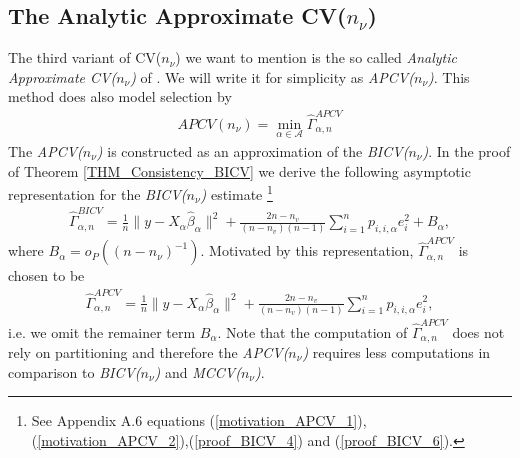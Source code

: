 \documentclass[Research_Module_ES.tex]{subfiles}
\begin{document}
\subsection{The Analytic Approximate CV($n_\nu$)}
The third variant of CV($n_\nu$) we want to mention is the so called \textit{Analytic Approximate CV($n_\nu$)} of \cite{shao}. We will write it for simplicity as \textit{APCV($n_\nu$)}. This method does also model selection by 
\begin{align*}
APCV(n_\nu)=\min_{\alpha\in\mathcal{A}}\hat{\Gamma}_{\alpha,n}^{APCV}
\end{align*}
The \textit{APCV($n_\nu$)} is constructed as an approximation of the \textit{BICV($n_\nu$)}. In the proof of Theorem \ref{THM_Consistency_BICV} we derive the following asymptotic representation for the \textit{BICV($n_\nu$)} estimate
\footnote{See Appendix A.6 equations (\ref{motivation_APCV_1}),(\ref{motivation_APCV_2}),(\ref{proof_BICV_4}) and (\ref{proof_BICV_6}).}
\begin{align*}
\hat{\Gamma}_{\alpha,n}^{BICV}=\frac{1}{n}\lVert y-X_\alpha\hat{\beta}_\alpha\rVert^2 + \frac{2n-n_v}{(n-n_v)(n-1)}\sum_{i=1}^np_{i,i,\alpha}e_i^2 + B_\alpha,
\end{align*}
where $B_\alpha = o_P((n-n_\nu)^{-1})$. 
Motivated by this representation, $\hat{\Gamma}_{\alpha,n}^{APCV}$ is chosen to be
\begin{align*}
\hat{\Gamma}_{\alpha,n}^{APCV}=\frac{1}{n}\lVert y-X_\alpha\hat{\beta}_\alpha\rVert^2 + \frac{2n-n_v}{(n-n_v)(n-1)}\sum_{i=1}^np_{i,i,\alpha}e_i^2,
\end{align*}
i.e. we omit the remainer term $B_\alpha$.
Note that the computation of $\hat{\Gamma}_{\alpha,n}^{APCV}$ does not rely on partitioning and therefore the \textit{APCV($n_\nu$)} requires less computations in comparison to \textit{BICV($n_\nu$)} and \textit{MCCV($n_\nu$)}.
\end{document}

